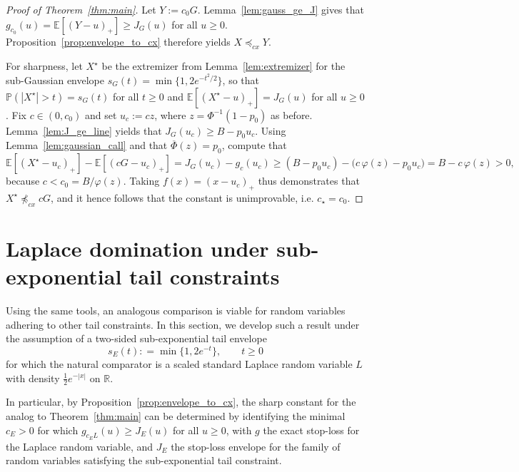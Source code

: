 \documentclass[11pt]{article}
\newcommand{\Pbb}{\mathbb{P}}
\newcommand{\Ebb}{\mathbb{E}}
\newcommand{\phin}{\varphi}
\newcommand{\Phib}{\overline{\Phi}}
\begin{document}
\begin{proof}[Proof of Theorem~\ref{thm:main}]
Let $Y := c_0 G$. Lemma~\ref{lem:gauss_ge_J} gives that $g_{c_0}(u) = \Ebb[(Y - u)_+]\ge J_G(u)$ for all $u \ge 0$.
Proposition~\ref{prop:envelope_to_cx} therefore yields $X \preceq_{cx} Y$.

For sharpness, let $X^\star$ be the extremizer from Lemma~\ref{lem:extremizer} for the sub-Gaussian envelope
$s_G (t) = \min \{1,2e^{-t^2/2}\}$, so that $\Pbb(|X^\star| > t) = s_G (t)$ for all $t \ge 0$ and $\Ebb [(X^\star - u)_+] = J_G (u)$ for all $u \ge 0$.
Fix $c\in (0, c_0)$ and set $u_c := c z$, where $z = \Phi^{-1} (1-p_0)$ as before.
Lemma~\ref{lem:J_ge_line} yields that $J_G (u_c) \ge B - p_0 u_c$. 
Using Lemma~\ref{lem:gaussian_call} and that $\Phib(z) = p_0$, compute that
%
\[
\Ebb [(X^\star - u_c)_+] - \Ebb[(c G - u_c)_+]
= J_G (u_c) - g_c (u_c)
\ge (B - p_0 u_c) - \bigl(c \, \phin(z) - p_0 u_c \bigr)
= B - c \, \phin (z)>0,
\]
%
because $c < c_0 = B / \phin(z)$. Taking $f(x) = (x-u_c)_+$ thus demonstrates that $X^\star \not \preceq_{cx} c G$, and it hence follows that the constant is unimprovable, i.e. $c_\star=c_0$.
\end{proof}



\section{Laplace domination under sub-exponential tail constraints}\label{sec:psi1}

Using the same tools, an analogous comparison is viable for random variables adhering to other tail constraints. In this section, we develop such a result under the assumption of a two-sided sub-exponential tail envelope %
\begin{equation}\label{eq:psi1_envelope}
s_E(t) : =\min \{1,2e^{-t}\},
\qquad t\ge 0
\end{equation}
%
for which the natural comparator is a scaled standard Laplace random variable $L$ with density $\frac12 e^{-|x|}$ on $\mathbb{R}$. 

In particular, by Proposition~\ref{prop:envelope_to_cx}, the sharp constant for the analog to Theorem~\ref{thm:main} can be determined by identifying the minimal $c_E > 0$ for which $g_{c_E L} (u) \ge J_E(u)$ for all $u \ge 0$, with $g$ the exact stop-loss for the Laplace random variable, and $J_E$ the stop-loss envelope for the family of random variables satisfying the sub-exponential tail constraint.
\end{document}
